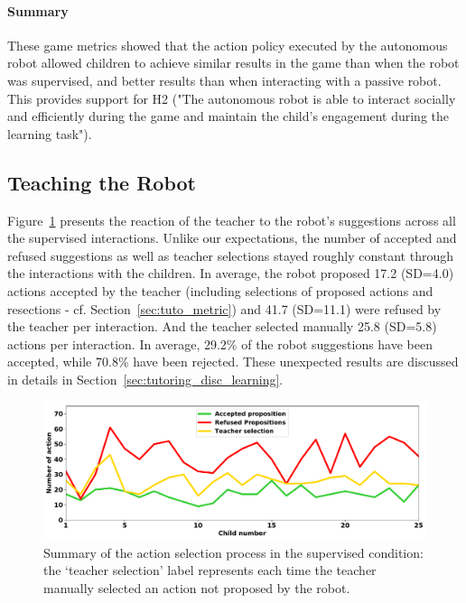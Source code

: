 \paragraph{Summary}

These game metrics showed that the action policy executed by the autonomous robot allowed children to achieve similar results in the game than when the robot was supervised, and better results than when interacting with a passive robot. This provides support for H2 ("The autonomous robot is able to interact socially and efficiently during the game and maintain the child's engagement during the learning task"). 

\subsection{Teaching the Robot}

Figure~\ref{fig:tutoring_supervision} presents the reaction of the teacher to the robot's suggestions across all the supervised interactions. Unlike our expectations, the number of accepted and refused suggestions as well as teacher selections stayed roughly constant through the interactions with the children. In average, the robot proposed 17.2 (SD=4.0) actions accepted by the teacher (including selections of proposed actions and resections - cf. Section~\ref{sec:tuto_metric}) and 41.7 (SD=11.1) were refused by the teacher per interaction. And the teacher selected manually 25.8 (SD=5.8) actions per interaction. In average, 29.2\% of the robot suggestions have been accepted, while 70.8\% have been rejected. These unexpected results are discussed in details in Section~\ref{sec:tutoring_disc_learning}.

\begin{figure}[ht]
	\includegraphics[width=1\linewidth]{./summary_supervision.pdf}
	\centering
	\caption{Summary of the action selection process in the supervised condition: the `teacher selection' label represents each time the teacher manually selected an action not proposed by the robot.}
	\label{fig:tutoring_supervision}
\end{figure}


